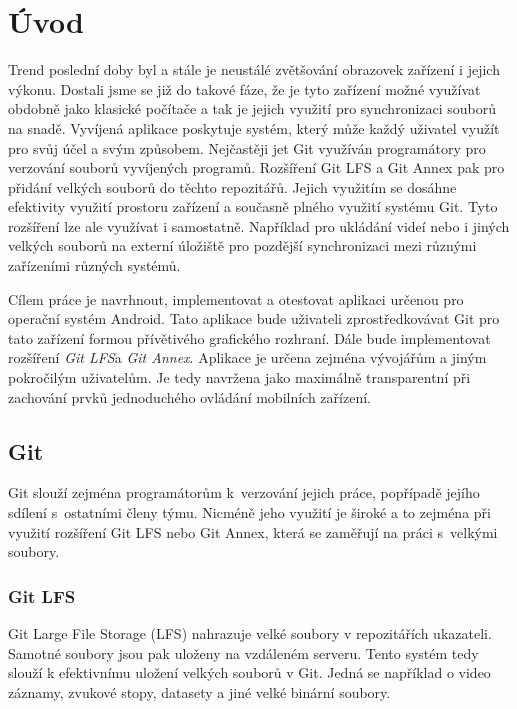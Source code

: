 \chapter{Úvod}
Trend poslední doby byl a stále je neustálé zvětšování obrazovek zařízení i jejich výkonu. Dostali jsme se již do takové fáze, že je tyto zařízení možné využívat obdobně jako klasické počítače a tak je jejich využití pro synchronizaci souborů na snadě.
Vyvíjená aplikace poskytuje systém, který může každý uživatel využít pro svůj účel a svým způsobem. Nejčastěji jet Git využíván programátory pro verzování souborů vyvíjených programů. Rozšíření Git LFS a Git Annex pak pro přidání velkých souborů do těchto repozitářů. Jejich využitím se dosáhne efektivity využití prostoru zařízení a současně plného využití systému Git. Tyto rozšíření lze ale využívat i samostatně. Například pro ukládání videí nebo i jiných velkých souborů na externí úložiště pro pozdější synchronizaci mezi různými zařízeními různých systémů.

Cílem práce je navrhnout, implementovat a otestovat aplikaci určenou pro operační systém Android. Tato aplikace bude uživateli zprostředkovávat Git pro tato zařízení formou přívětivého grafického rozhraní. Dále bude implementovat rozšíření \emph{Git LFS}a \emph{Git Annex}. Aplikace je určena zejména vývojářům a jiným pokročilým uživatelům. Je tedy navržena jako maximálně transparentní při zachování prvků jednoduchého ovládání mobilních zařízení.

\newpage
\section {Git}
Git slouží zejména programátorům k verzování jejich práce, popřípadě jejího sdílení s ostatními členy týmu. Nicméně jeho využití je široké a to zejména při využití rozšíření Git LFS nebo Git Annex, která se zaměřují na práci s velkými soubory.

\subsection{Git LFS}
Git Large File Storage (LFS) nahrazuje velké soubory v repozitářích ukazateli. Samotné soubory jsou pak uloženy na vzdáleném serveru. Tento systém tedy slouží k efektivnímu uložení velkých souborů v Git. Jedná se například o video záznamy, zvukové stopy, datasety a jiné velké binární soubory.

